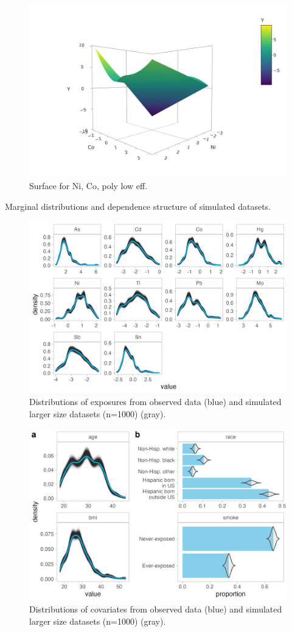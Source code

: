 \documentclass[12pt, twoside]{amherstthesis}
\begin{document}
\begin{figure}

{\centering \includegraphics[width=0.5\linewidth]{figures/surfaces/cp2} 

}

\caption{Surface for Ni, Co, poly low eff.}\label{fig:cp2}
\end{figure}
Marginal distributions and dependence structure of simulated datasets.
\begin{figure}

{\centering \includegraphics[width=0.75\linewidth]{figures/ch4_univ_exp_sim_lg} 

}

\caption{Distributions of exposures from observed data (blue) and simulated larger size datasets (n=1000) (gray).}\label{fig:univexplg}
\end{figure}
\begin{figure}

{\centering \includegraphics[width=0.75\linewidth]{figures/ch4_univ_cov_sim_lg} 

}

\caption{Distributions of covariates from observed data (blue) and simulated larger size datasets (n=1000) (gray).}\label{fig:univcovlg}
\end{figure}
\end{document}

